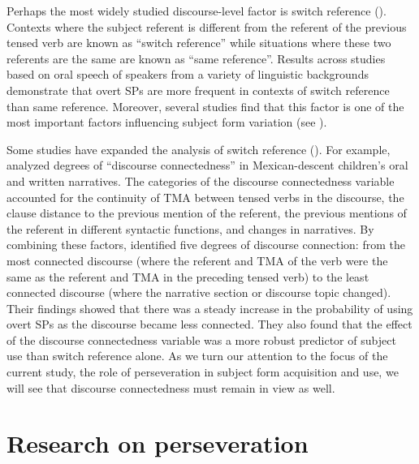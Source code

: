 \documentclass[output=paper]{langscibook}
\begin{document}
Perhaps the most widely studied discourse-level factor is switch reference (\citealt{BayleyPease-Alvarez1997, Bentivoglio1987, Cameron1994, Cameron1995, CameronFlores-Ferrán2004, ErkerGuy2012, OtheguyEtAl2007, Silva-Corvalán1994, ShinCairns2009, ShinOtheguy2009, TorresTravis2010, Travis2007}). Contexts where the subject referent is different from the referent of the previous tensed verb are known as “switch reference” while situations where these two referents are the same are known as “same reference”. Results across studies based on oral speech of speakers from a variety of linguistic backgrounds demonstrate that overt SPs are more frequent in contexts of switch reference than same reference. Moreover, several studies find that this factor is one of the most important factors influencing subject form variation (see \citealt[28]{Cameron1994}).



Some studies have expanded the analysis of switch reference (\citealt{BayleyPease-Alvarez1997, Cameron1995, Travis2007}). For example, \citet{BayleyPease-Alvarez1997} analyzed degrees of “discourse connectedness” in Mexican-descent children’s oral and written narratives. The categories of the discourse connectedness variable accounted for the continuity of TMA between tensed verbs in the discourse, the clause distance to the previous mention of the referent, the previous mentions of the referent in different syntactic functions, and changes in narratives. By combining these factors, \citet{BayleyPease-Alvarez1997} identified five degrees of discourse connection: from the most connected discourse (where the referent and TMA of the verb were the same as the referent and TMA in the preceding tensed verb) to the least connected discourse (where the narrative section or discourse topic changed). Their findings showed that there was a steady increase in the probability of using overt SPs as the discourse became less connected. They also found that the effect of the discourse connectedness variable was a more robust predictor of subject use than switch reference alone. As we turn our attention to the focus of the current study, the role of perseveration in subject form acquisition and use, we will see that discourse connectedness must remain in view as well.



\section{Research on perseveration}\label{sec:geeslin:3}
\end{document}
